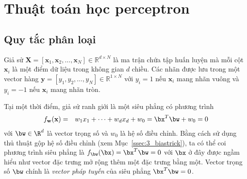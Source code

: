  
 

 



 
 
\section{Thuật toán học perceptron}

 
 
\subsection{Quy tắc phân loại}
Giả sử $\mathbf{X} = [\mathbf{x}_1, \mathbf{x}_2, \dots, \mathbf{x}_N] \in \mathbb{R}^{d \times N}$ là ma trận chứa tập huấn luyện mà mỗi cột $\mathbf{x}_i$ là một điểm dữ liệu trong không gian $d$ chiều. 
Các nhãn được lưu trong một vector hàng $\mathbf{y} = [y_1, y_2, \dots, y_N] \in \mathbb{R}^{1\times N}$ với $y_i = 1$ nếu $\mathbf{x}_i$ mang nhãn vuông và $y_i = -1$ nếu $\mathbf{x}_i$ mang nhãn tròn.
 
Tại một thời điểm, giả sử ranh giới là một siêu phẳng có phương trình
\begin{eqnarray} 
    f_{\mathbf{w}}(\mathbf{x}) &=& w_1x_1 + \dots + w_dx_d + w_0 =\bx^T\bw + w_0 = 0
\end{eqnarray} 
với $\bw \in \R^d$ là vector trọng số và $w_0$ là hệ số điều chỉnh. Bằng cách sử dụng thủ thuật gộp hệ số điều chỉnh (xem Mục~\ref{ssec:3_biastrick}), ta có thể coi phương trình siêu phẳng là
$f_{\bw}(\bx) = \bx^T\bw = 0$ với $\bx$ ở đây được ngầm hiểu như vector đặc
trưng mở rộng thêm một đặc trưng bằng một. Vector trọng số $\bw$ chính là
\textit{vector pháp tuyến} của siêu phẳng $\bx^T\bw = 0$.


